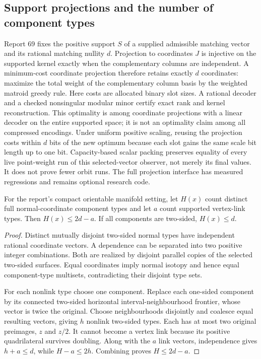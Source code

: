 \subsection{Support projections and the number of component types}

Report 69 fixes the positive support $S$ of a supplied admissible matching
vector and its rational matching nullity $d$. Projection to coordinates $J$
is injective on the supported kernel exactly when the complementary columns
are independent. A minimum-cost coordinate projection therefore retains
exactly $d$ coordinates: maximize the total weight of the complementary
column basis by the weighted matroid greedy rule. Here costs are allocated
binary slot sizes. A rational decoder and a checked nonsingular modular
minor certify exact rank and kernel reconstruction. This optimality is
among coordinate projections with a linear decoder on the entire supported
space; it is not an optimality claim among all compressed encodings.
Under uniform positive scaling, reusing the projection costs within $d$
bits of the new optimum because each slot gains the same scale bit length
up to one bit. Capacity-based scalar packing preserves equality of every
live point-weight run of this selected-vector observer, not merely its
final values. It does not prove fewer orbit runs. The full projection
interface has measured regressions and remains optional research code.

\begin{proposition}
For the report's compact orientable manifold setting, let $H(x)$ count
distinct full normal-coordinate component types and let $a$ count supported
vertex-link types. Then $H(x)\le2d-a$. If all components are two-sided,
$H(x)\le d$.
\end{proposition}
\begin{proof}
Distinct mutually disjoint two-sided normal types have independent rational
coordinate vectors. A dependence can be separated into two positive integer
combinations. Both are realized by disjoint parallel copies of the selected
two-sided surfaces. Equal coordinates imply normal isotopy and hence equal
component-type multisets, contradicting their disjoint type sets.

For each nonlink type choose one component. Replace each one-sided component
by its connected two-sided horizontal interval-neighbourhood frontier,
whose vector is twice the original. Choose neighbourhoods disjointly and
coalesce equal resulting vectors, giving $h$ nonlink two-sided types. Each
has at most two original preimages, $z$ and $z/2$. It cannot become a
vertex link because its positive quadrilateral survives doubling. Along
with the $a$ link vectors, independence gives $h+a\le d$, while
$H-a\le2h$. Combining proves $H\le2d-a$.
\end{proof}

